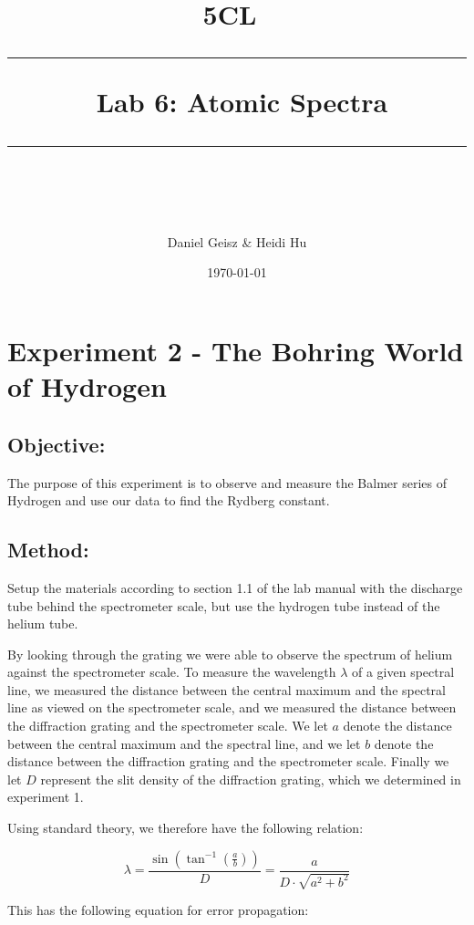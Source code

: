 \documentclass[11pt]{article}
\title{	
	\normalfont\normalsize
	\textsc{ 5CL}\ %
	\vspace{25pt} %
	\rule{\linewidth}{0.5pt}\ %
	\vspace{20pt} %
	{\huge Lab 6: Atomic Spectra}\ %
	\vspace{12pt} %
	\rule{\linewidth}{2pt}\ %
	\vspace{12pt} %
}
\author{\LARGE Daniel Geisz \& Heidi Hu} %
\date{\normalsize\today}
\begin{document}
    
    
    \maketitle
    
    

    
    \hypertarget{experiment-2---the-bohring-world-of-hydrogen}{%
\section{Experiment 2 - The Bohring World of
Hydrogen}\label{experiment-2---the-bohring-world-of-hydrogen}}

\hypertarget{objective}{%
\subsection{Objective:}\label{objective}}

The purpose of this experiment is to observe and measure the Balmer
series of Hydrogen and use our data to find the Rydberg constant.

\hypertarget{method}{%
\subsection{Method:}\label{method}}

Setup the materials according to section 1.1 of the lab manual with the
discharge tube behind the spectrometer scale, but use the hydrogen tube
instead of the helium tube.

By looking through the grating we were able to observe the spectrum of
helium against the spectrometer scale. To measure the wavelength
\(\lambda\) of a given spectral line, we measured the distance between
the central maximum and the spectral line as viewed on the spectrometer
scale, and we measured the distance between the diffraction grating and
the spectrometer scale. We let \(a\) denote the distance between the
central maximum and the spectral line, and we let \(b\) denote the
distance between the diffraction grating and the spectrometer scale.
Finally we let \(D\) represent the slit density of the diffraction
grating, which we determined in experiment 1.

Using standard theory, we therefore have the following relation:

\[ \lambda = \frac{\sin\left(\tan^{-1}\left(\frac{a}{b}\right)\right)}{D} = \frac{a}{D\cdot \sqrt{a^2 + b^2}}\]

This has the following equation for error propagation:
\end{document}
